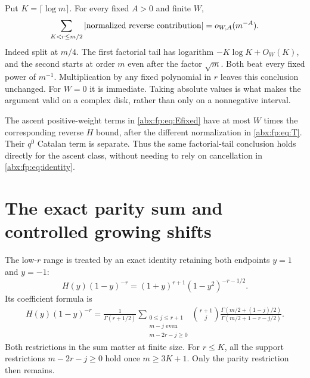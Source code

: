 \documentclass[11pt,letterpaper]{article}
\numberwithin{equation}{section}
\theoremstyle{remark}\newtheorem{remark}[theorem]{Remark}
\begin{document}
Put $K=\lceil\log m\rceil$. For every fixed $A>0$ and finite $W$,
\begin{equation}\label{abx:fp:eq:tails}
 \sum_{K<r\le m/2}\left|\hbox{normalized reverse contribution}\right|
      =o_{W,A}(m^{-A}).
\end{equation}
Indeed split at $m/4$. The first factorial tail has logarithm
$-K\log K+O_W(K)$, and the second starts at order $m$ even after the
factor $\sqrt m$. Both beat every fixed power of $m^{-1}$.
Multiplication by any fixed polynomial in $r$ leaves this conclusion
unchanged. For $W=0$ it is immediate. Taking absolute values is what
makes the argument valid on a complex disk, rather than only on a
nonnegative interval.

The ascent positive-weight terms in \eqref{abx:fp:eq:Efixed} have at most
$W$ times the corresponding reverse $H$ bound, after the different
normalization in \eqref{abx:fp:eq:T}. Their $q^0$ Catalan term is separate.
Thus the same factorial-tail conclusion holds directly for the ascent
class, without needing to rely on cancellation in \eqref{abx:fp:eq:identity}.

\section{The exact parity sum and controlled growing shifts}\label{abx:fp:sec:low}
The low-$r$ range is treated by an exact identity retaining both
endpoints $y=1$ and $y=-1$:
\begin{equation}\label{abx:fp:eq:parityidentity}
 H(y)(1-y)^{-r}=(1+y)^{r+1}(1-y^2)^{-r-1/2}.
\end{equation}
Its coefficient formula is
\begin{align}
 [y^{m-2r}]H(y)(1-y)^{-r}
 =\frac1{\Gamma(r+1/2)}
 \sum_{\substack{0\le j\le r+1\\m-j\text{ even}\\m-2r-j\ge0}}
 \binom{r+1}{j}
 \frac{\Gamma(m/2+(1-j)/2)}{\Gamma(m/2+1-r-j/2)}.
 \label{abx:fp:eq:paritysum}
\end{align}
Both restrictions in the sum matter at finite size. For $r\le K$,
all the support restrictions $m-2r-j\ge0$ hold once $m\ge3K+1$.
Only the parity restriction then remains.
\end{document}
